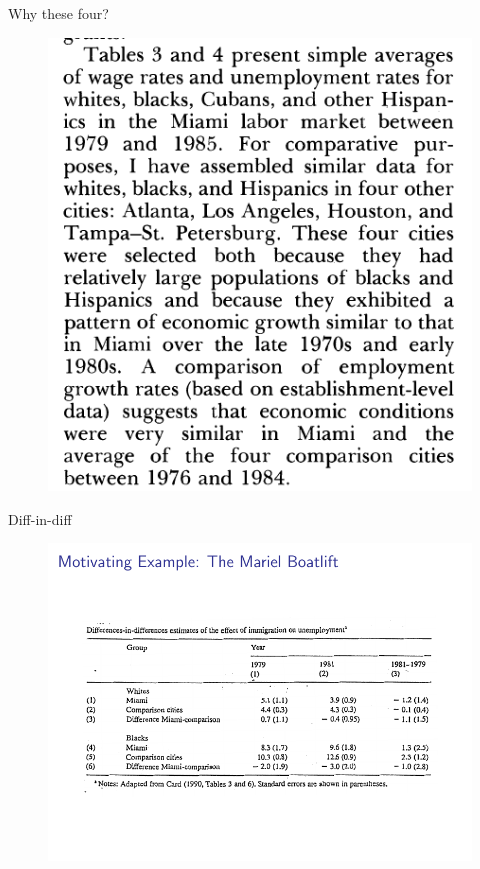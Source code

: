 \documentclass{beamer}
\begin{document}
\begin{frame}{Why these four?}

	\begin{figure}
	\includegraphics[scale=0.25]{./lecture_includes/card_illr.png}
	\end{figure}

\end{frame}

\begin{frame}{Diff-in-diff}
	
	\begin{figure}
	\includegraphics[scale=0.75]{./lecture_includes/abadie_2.pdf}
	\end{figure}
\end{frame}
\end{document}
